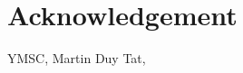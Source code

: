 \documentclass{article}
\begin{document}
\section{Acknowledgement}
YMSC, Martin Duy Tat, 






\end{document}

